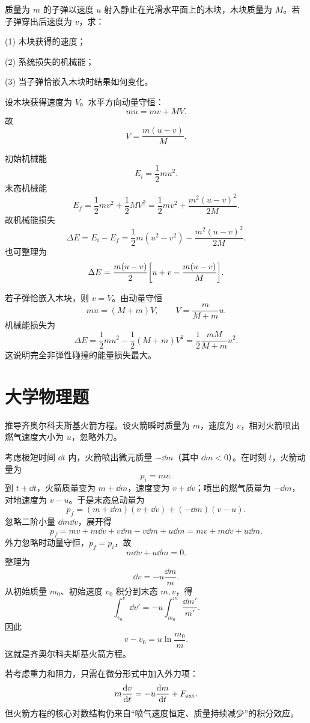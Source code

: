 \begin{competition}
质量为 $m$ 的子弹以速度 $u$ 射入静止在光滑水平面上的木块，木块质量为 $M$。若子弹穿出后速度为 $v$，求：

(1) 木块获得的速度；

(2) 系统损失的机械能；

(3) 当子弹恰嵌入木块时结果如何变化。

\begin{solution}
设木块获得速度为 $V$。水平方向动量守恒：
\[
mu=mv+MV.
\]
故
\[
V=\frac{m(u-v)}{M}.
\]

初始机械能
\[
E_i=\frac12 mu^2.
\]
末态机械能
\[
E_f=\frac12 mv^2+\frac12 MV^2
=\frac12 mv^2+\frac{m^2(u-v)^2}{2M}.
\]
故机械能损失
\[
\Delta E=E_i-E_f
=\frac12 m(u^2-v^2)-\frac{m^2(u-v)^2}{2M}.
\]
也可整理为
\[
\Delta E=\frac{m(u-v)}{2}\qty[u+v-\frac{m(u-v)}{M}].
\]

若子弹恰嵌入木块，则 $v=V$。由动量守恒
\[
mu=(M+m)V,
\qquad
V=\frac{m}{M+m}u.
\]
机械能损失为
\[
\Delta E=\frac12 mu^2-\frac12(M+m)V^2
=\frac12\frac{mM}{M+m}u^2.
\]
这说明完全非弹性碰撞的能量损失最大。
\end{solution}
\end{competition}

\section*{大学物理题}

\begin{university}
推导齐奥尔科夫斯基火箭方程。设火箭瞬时质量为 $m$，速度为 $v$，相对火箭喷出燃气速度大小为 $u$，忽略外力。

\begin{solution}
考虑极短时间 $\dd t$ 内，火箭喷出微元质量 $-\dd m$（其中 $\dd m<0$）。在时刻 $t$，火箭动量为
\[
p_i=mv.
\]
到 $t+\dd t$，火箭质量变为 $m+\dd m$，速度变为 $v+\dd v$；喷出的燃气质量为 $-\dd m$，对地速度为 $v-u$。于是末态总动量为
\[
p_f=(m+\dd m)(v+\dd v)+(-\dd m)(v-u).
\]
忽略二阶小量 $\dd m\dd v$，展开得
\[
p_f=mv+m\dd v+v\dd m-v\dd m+u\dd m=mv+m\dd v+u\dd m.
\]
外力忽略时动量守恒，$p_f=p_i$，故
\[
m\dd v+u\dd m=0.
\]
整理为
\[
\dd v=-u\frac{\dd m}{m}.
\]
从初始质量 $m_0$、初始速度 $v_0$ 积分到末态 $m,v$，得
\[
\int_{v_0}^{v}\dd v'=-u\int_{m_0}^{m}\frac{\dd m'}{m'}.
\]
因此
\[
v-v_0=u\ln\frac{m_0}{m}.
\]
这就是齐奥尔科夫斯基火箭方程。

若考虑重力和阻力，只需在微分形式中加入外力项：
\[
m\dv{v}{t}=-u\dv{m}{t}+F_\text{ext}.
\]
但火箭方程的核心对数结构仍来自“喷气速度恒定、质量持续减少”的积分效应。
\end{solution}
\end{university}

